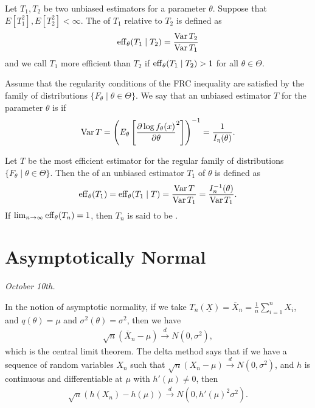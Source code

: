 \begin{definition}
    Let $T_{1},T_{2}$ be two unbiased estimators for a parameter $\theta$. Suppose that $E[T_{1}^{2}],E[T_{2}^{2}] < \infty$. The  of $T_{1}$ relative to $T_{2}$ is defined as
    \begin{align}
        \operatorname{eff}_{\theta} (T_{1} \mid T_{2}) = \frac{\operatorname{Var} T_{2}}{\operatorname{Var} T_{1}}
    \end{align}
    and we call $T_{1}$ more efficient than $T_{2}$ if $\operatorname{eff}_{\theta}(T_{1} \mid T_{2}) > 1$ for all $\theta \in \Theta$.
\end{definition}

\begin{definition}
    Assume that the regularity conditions of the FRC inequality are satisfied by the family of distributions $\{F_{\theta} \mid \theta \in \Theta\}$. We say that an unbiased estimator $T$ for the parameter $\theta$ is  if
    \begin{align}
        \operatorname{Var} T = \left( E_{\theta} \left[ \frac{\partial \log f_{\theta}(x)}{\partial \theta} ^{2}\right] \right)^{-1} = \frac{1}{I_{\eta}(\theta)}.
    \end{align}
\end{definition}

\begin{definition}
    Let $T$ be the most efficient estimator for the regular family of distributions $\{F_{\theta} \mid \theta \in \Theta\}$. Then the  of an unbiased estimator $T_{1}$ of $\theta$ is defined as
    \begin{align}
        \operatorname{eff}_{\theta}(T_{1}) = \operatorname{eff}_{\theta}(T_{1} \mid T) = \frac{\operatorname{Var} T}{\operatorname{Var} T_{1}} = \frac{I_{n}^{-1}(\theta)}{\operatorname{Var} T_{1}}.
    \end{align}
    If $\lim_{n \to \infty} \operatorname{eff}_{\theta}(T_{n}) = 1$, then $T_{n}$ is said to be .
\end{definition}

\section{Asymptotically Normal}

\textit{October 10th.}

In the notion of asymptotic normality, if we take $T_{n}(\underline{X}) = \overline{X}_{n} = \frac{1}{n} \sum_{i=1}^{n} X_{i}$, and $q(\theta) = \mu$ and $\sigma^{2}(\theta) = \sigma^{2}$, then we have
\begin{align}
    \sqrt{n}(\overline{X}_{n} - \mu) \xrightarrow{d} N(0,\sigma^{2}),
\end{align}
which is the central limit theorem. The delta method says that if we have a sequence of random variables $X_{n}$ such that $\sqrt{n}(X_{n} - \mu) \xrightarrow{d} N(0,\sigma^{2})$, and $h$ is continuous and differentiable at $\mu$ with $h'(\mu) \neq 0$, then
\begin{align}
    \sqrt{n}(h(X_{n}) - h(\mu)) \xrightarrow{d} N(0,h'(\mu)^{2}\sigma^{2}).
\end{align}

